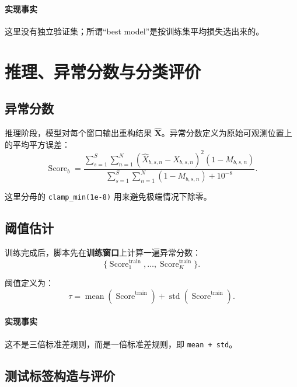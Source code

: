 \documentclass[UTF8]{ctexart}
\begin{document}
\paragraph{实现事实}
这里没有独立验证集；所谓“best model”是按训练集平均损失选出来的。

\section{推理、异常分数与分类评价}

\subsection{异常分数}

推理阶段，模型对每个窗口输出重构结果 $\hat{\bm{X}}$。异常分数定义为原始可观测位置上的平均平方误差：
\begin{equation}
    \operatorname{Score}_b
    =
    \frac{
        \sum_{s=1}^{S}\sum_{n=1}^{N}
        (\hat{X}_{b,s,n} - X_{b,s,n})^2 (1-M_{b,s,n})
    }{
        \sum_{s=1}^{S}\sum_{n=1}^{N}(1-M_{b,s,n}) + 10^{-8}
    }.
\end{equation}

这里分母的 \texttt{clamp\_min(1e-8)} 用来避免极端情况下除零。

\subsection{阈值估计}

训练完成后，脚本先在\textbf{训练窗口}上计算一遍异常分数：
\begin{equation}
    \{\operatorname{Score}^{\text{train}}_1, \dots, \operatorname{Score}^{\text{train}}_K\}.
\end{equation}

阈值定义为：
\begin{equation}
    \tau
    =
    \operatorname{mean}(\operatorname{Score}^{\text{train}})
    +
    \operatorname{std}(\operatorname{Score}^{\text{train}}).
\end{equation}

\paragraph{实现事实}
这不是三倍标准差规则，而是一倍标准差规则，即 \texttt{mean + std}。

\subsection{测试标签构造与评价}
\end{document}
